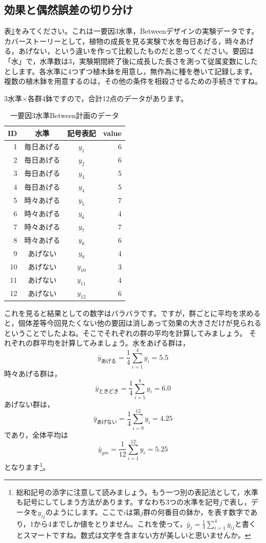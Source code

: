 \documentclass{ltjbook}
\begin{document}
\subsection{効果と偶然誤差の切り分け}
\label{generalLinear}
表\ref{table::12_02}をみてください。これは一要因3水準，Betweenデザインの実験データです。カバーストーリーとして，植物の成長を見る実験で水を毎日あげる，時々あげる，あげない，という違いを作って比較したものだと思ってください。要因は「水」で，水準数は3，実験期間終了後に成長した長さを測って従属変数にしたとします。各水準に4つずつ植木鉢を用意し，無作為に種を巻いて記録します。複数の植木鉢を用意するのは，その他の条件を相殺させるための手続きですね。

3水準$\times$各群4鉢ですので，合計12点のデータがあります。

\begin{table}[ht]
	\centering
	\caption{一要因3水準Between計画のデータ}
	\begin{tabular}{rccr}
		\hline
		ID & 水準    & 記号表記     & value \\
		\hline
		1  & 毎日あげる & $y_{1}$  & 6     \\
		2  & 毎日あげる & $y_{2}$  & 6     \\
		3  & 毎日あげる & $y_{3}$  & 5     \\
		4  & 毎日あげる & $y_{4}$  & 5     \\
		5  & 時々あげる & $y_{5}$  & 7     \\
		6  & 時々あげる & $y_{6}$  & 4     \\
		7  & 時々あげる & $y_{7}$  & 7     \\
		8  & 時々あげる & $y_{8}$  & 6     \\
		9  & あげない  & $y_{9}$  & 4     \\
		10 & あげない  & $y_{10}$ & 3     \\
		11 & あげない  & $y_{11}$ & 4     \\
		12 & あげない  & $y_{12}$ & 6     \\
		\hline
	\end{tabular}
	\label{table::12_02}
\end{table}

これを見ると結果としての数字はバラバラです。ですが，群ごとに平均を求めると，個体差等今回見たくない他の要因は消しあって効果の大きさだけが見られるということでしたよね。そこでそれぞれの群の平均を計算してみましょう。
それぞれの群平均を計算してみましょう。水をあげる群は，
\[ \bar{y}_{あげる} =\frac{1}{4}\sum_{i=1}^4 y_i = 5.5\]
時々あげる群は，
\[ \bar{y}_{ときどき} = \frac{1}{4}\sum_{i=5}^8 y_i = 6.0 \]
あげない群は，
\[ \bar{y}_{あげない} = \frac{1}{4}\sum_{i=9}^{12} y_i = 4.25\]
であり，全体平均は
\[ \bar{y}_{gm}= \frac{1}{12}\sum_{i=1}^{12} y_i = 5.25 \]
となります\footnote{総和記号の添字に注意して読みましょう。もう一つ別の表記法として，水準も記号にしてしまう方法があります。すなわち3つの水準を記号$j$で表し，データを$y_{ij}$のようにします。ここで$i$は第$j$群の何番目の鉢か，を表す数字であり，1から4までしか値をとりません。これを使って，$\bar{y}_j = \frac{1}{4}\sum_{i=1}^4 y_{ij}$と書くとスマートですね。数式は文字を含まない方が美しいと思いませんか。}。
\end{document}
